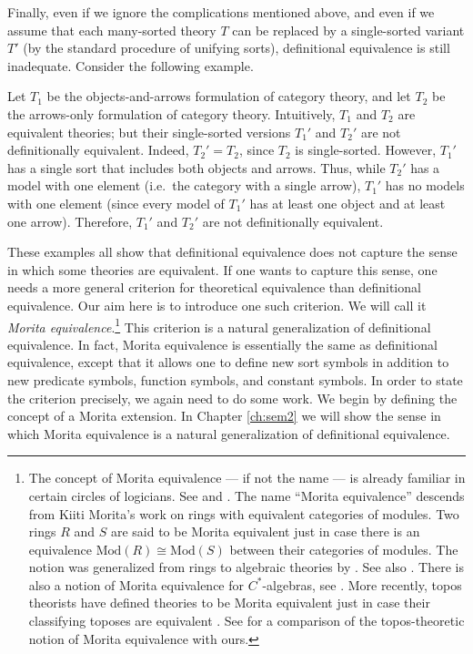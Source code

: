 Finally, even if we ignore the complications mentioned above, and even
if we assume that each many-sorted theory $T$ can be replaced by a
single-sorted variant $T'$ (by the standard procedure of unifying
sorts), definitional equivalence is still inadequate.  Consider the
following example.

\begin{example} Let $T_1$ be the objects-and-arrows formulation of
  category theory, and let $T_2$ be the arrows-only formulation of
  category theory.  Intuitively, $T_1$ and $T_2$ are equivalent
  theories; but their single-sorted versions $T_1'$ and $T_2'$ are not
  definitionally equivalent.  Indeed, $T_2'=T_2$, since $T_2$ is
  single-sorted.  However, $T_1'$ has a single sort that includes both
  objects and arrows.  Thus, while $T_2'$ has a model with one element
  (i.e.\ the category with a single arrow), $T_1'$ has no models with
  one element (since every model of $T_1'$ has at least one object and
  at least one arrow).  Therefore, $T_1'$ and $T_2'$ are not
  definitionally equivalent. \end{example}

These examples all show that definitional equivalence does not capture
the sense in which some theories are equivalent. If one wants to
capture this sense, one needs a more general criterion for theoretical
equivalence than definitional equivalence. Our aim here is to
introduce one such criterion. We will call it \emph{Morita
  equivalence}.\footnote{The concept of Morita equivalence --- if not
  the name --- is already familiar in certain circles of
  logicians. See \cite{andreka2008} and \cite{mere1992}. The name
  ``Morita equivalence'' descends from Kiiti Morita's work on rings
  with equivalent categories of modules.  Two rings $R$ and $S$ are
  said to be Morita equivalent just in case there is an equivalence
  $\text{Mod}(R)\cong \text{Mod}(S)$ between their categories of
  modules.  The notion was generalized from rings to algebraic
  theories by \cite{dukarm}. See also \cite{adamek}.  There is also a
  notion of Morita equivalence for $C^*$-algebras, see
  \cite{rieffel}. More recently, topos theorists have defined theories
  to be Morita equivalent just in case their classifying toposes are
  equivalent \citep{johnstone}. See \cite{tsementzis} for a comparison
  of the topos-theoretic notion of Morita equivalence with ours.} This
criterion is a natural generalization of definitional equivalence. In
fact, Morita equivalence is essentially the same as definitional
equivalence, except that it allows one to define new sort symbols in
addition to new predicate symbols, function symbols, and constant
symbols. In order to state the criterion precisely, we again need to
do some work. We begin by defining the concept of a Morita extension.
In Chapter \ref{ch:sem2} we will show the sense in which Morita
equivalence is a natural generalization of definitional equivalence.

